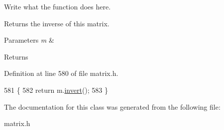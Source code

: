 Write what the function does here. 

\begin{DoxyReturn}{Returns}
the inverse of this matrix. 
\end{DoxyReturn}

\begin{DoxyParams}{Parameters}
{\em m} & \\
\hline
\end{DoxyParams}
\begin{DoxyReturn}{Returns}

\end{DoxyReturn}


Definition at line 580 of file matrix.\+h.


\begin{DoxyCode}
581         \{
582             \textcolor{keywordflow}{return} m.\hyperlink{classMatrix_acaac7c3eb8f32224c07dcd620ca44e26}{invert}();
583         \}
\end{DoxyCode}


The documentation for this class was generated from the following file\+:\begin{DoxyCompactItemize}
\item 
matrix.\+h\end{DoxyCompactItemize}

